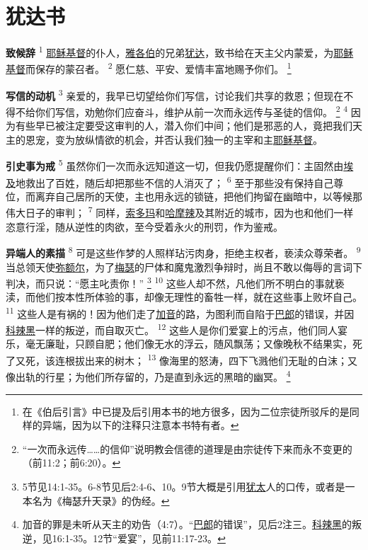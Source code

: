 \chapter{犹达书}

\textbf{致候辞 }
\textsuperscript{1}
\uline{耶稣}\uline{基督}的仆人，\uline{雅各伯}的兄弟\uline{犹达}，致书给在天主父内蒙爱，为\uline{耶稣}\uline{基督}而保存的蒙召者。
\textsuperscript{2}
愿仁慈、平安、爱情丰富地赐予你们。
\footnote{在《伯后引言》中已提及后引用本书的地方很多，因为二位宗徒所驳斥的是同样的异端，因为以下的注释只注意本书特有者。}

\textbf{写信的动机 }
\textsuperscript{3}
亲爱的，我早已切望给你们写信，讨论我们共享的救恩；但现在不得不给你们写信，劝勉你们应奋斗，维护从前一次而永远传与圣徒的信仰。
\footnote{“一次而永远传……的信仰”说明教会信德的道理是由宗徒传下来而永不变更的（前11:2；前6:20）。}
\textsuperscript{4}
因为有些早已被注定要受这审判的人，潜入你们中间；他们是邪恶的人，竟把我们天主的恩宠，变为放纵情欲的机会，并否认我们独一的主宰和主\uline{耶稣}\uline{基督}。

\textbf{引史事为戒 }
\textsuperscript{5}
虽然你们一次而永远知道这一切，但我仍愿提醒你们：主固然由\uline{埃及}地救出了百姓，随后却把那些不信的人消灭了；
\textsuperscript{6}
至于那些没有保持自己尊位，而离弃自己居所的天使，主也用永远的锁链，把他们拘留在幽暗中，以等候那伟大日子的审判；
\textsuperscript{7}
同样，\uline{索多玛}和\uline{哈摩辣}及其附近的城市，因为也和他们一样恣意行淫，随从逆性的肉欲，至今受着永火的刑罚，作为鉴戒。

\textbf{异端人的素描 }
\textsuperscript{8}
可是这些作梦的人照样玷污肉身，拒绝主权者，亵渎众尊荣者。
\textsuperscript{9}
当总领天使\uline{弥额尔}，为了\uline{梅瑟}的尸体和魔鬼激烈争辩时，尚且不敢以侮辱的言词下判决，而只说：“愿主叱责你！”
\footnote{5节见14:1-35。6-8节见后2:4-6、10。9节大概是引用\uline{犹太}人的口传，或者是一本名为《梅瑟升天录》的伪经。}
\textsuperscript{10}
这些人却不然，凡他们所不明白的事就亵渎，而他们按本性所体验的事，却像无理性的畜牲一样，就在这些事上败坏自己。
\textsuperscript{11}
这些人是有祸的！因为他们走了\uline{加音}的路，为图利而自陷于\uline{巴郎}的错误，并因\uline{科辣黑}一样的叛逆，而自取灭亡。
\textsuperscript{12}
这些人是你们爱宴上的污点，他们同人宴乐，毫无廉耻，只顾自肥；他们像无水的浮云，随风飘荡；又像晚秋不结果实，死了又死，该连根拔出来的树木；
\textsuperscript{13}
像海里的怒涛，四下飞溅他们无耻的白沫；又像出轨的行星；为他们所存留的，乃是直到永远的黑暗的幽冥。
\footnote{加音的罪是未听从天主的劝告（4:7）。“\uline{巴郎}的错误”，见后2注三。\uline{科辣黑}的叛逆，见16:1-35。12节“爱宴”，见前11:17-23。}

